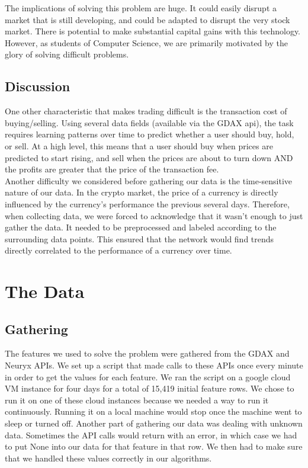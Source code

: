 \documentclass{article}
\begin{document}
The implications of solving this problem are huge. It could easily disrupt a market that is still developing, and could be adapted to disrupt the very stock market. There is potential to make substantial capital gains with this technology. However, as students of Computer Science, we are primarily motivated by the glory of solving difficult problems.

\subsection{ Discussion }
One other characteristic that makes trading difficult is the transaction cost of buying/selling. Using several data fields (available via the GDAX api), the task requires learning patterns over time to predict whether a user should buy, hold, or sell. At a high level, this means that a user should buy when prices are predicted to start rising, and sell when the prices are about to turn down AND the profits are greater that the price of the transaction fee.\\

Another difficulty we considered before gathering our data is the time-sensitive nature of our data. In the crypto market, the price of a currency is directly influenced by the currency's performance the previous several days. Therefore, when collecting data, we were forced to acknowledge that it wasn't enough to just gather the data. It needed to be preprocessed and labeled according to the surrounding data points. This ensured that the network would find trends directly correlated to the performance of a currency over time.

\section{ The Data }

\subsection{ Gathering }
The features we used to solve the problem were gathered from the GDAX and Neuryx APIs. We set up a script that made calls to these APIs once every minute in order to get the values for each feature. We ran the script on a google cloud VM instance for four days for a total of 15,419 initial feature rows. We chose to run it on one of these cloud instances because we needed a way to run it continuously. Running it on a local machine would stop once the machine went to sleep or turned off. 
Another part of gathering our data was dealing with unknown data. Sometimes the API calls would return with an error, in which case we had to put None into our data for that feature in that row. We then had to make sure that we handled these values correctly in our algorithms. \\
\end{document}
